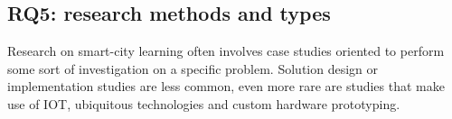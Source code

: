 \subsection*{RQ5: research methods and types}
Research on smart-city learning often involves case studies oriented to perform some sort of investigation on a specific problem. Solution design or implementation studies are less common, even more rare are studies that make use of IOT, ubiquitous technologies and custom hardware prototyping.